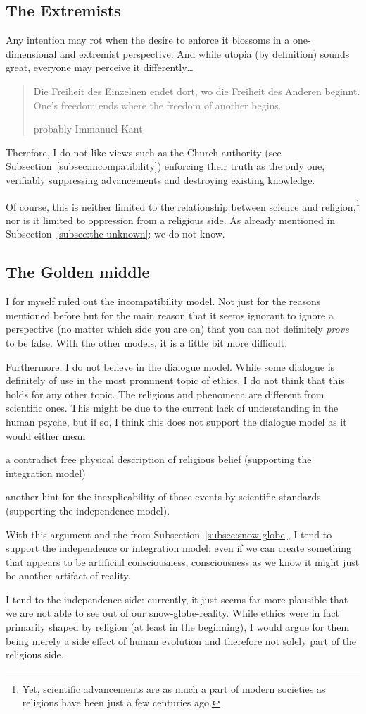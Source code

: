 \subsection{The Extremists}
Any intention may rot when the desire to enforce it blossoms in a one-dimensional and extremist perspective.
And while utopia (by definition) sounds great, everyone may perceive it differently\ldots
\blockquote[probably Immanuel Kant]{Die Freiheit des Einzelnen endet dort, wo die Freiheit des Anderen beginnt.\\\textcolor{gray}{One's freedom ends where the freedom of another begins.}}
Therefore, I do not like views such as the Church authority (see Subsection~\ref{subsec:incompatibility}) enforcing their truth as the only one, verifiably suppressing advancements and destroying existing knowledge.

Of course, this is neither limited to the relationship between science and religion,\footnote{Yet, scientific advancements are as much a part of modern societies as religions have been just a few centuries ago.} nor is it limited to oppression from a religious side. As already mentioned in Subsection~\ref{subsec:the-unknown}: we do not know.


\subsection{The Golden middle}
\label{subsec:golden-middle}
I for myself ruled out the incompatibility model. Not just for the reasons mentioned before but for the main reason that it seems ignorant to ignore a perspective (no matter which side you are on) that you can not definitely \emph{prove} to be false.
With the other models, it is a little bit more difficult.

Furthermore, I do not believe in the dialogue model. While some dialogue is definitely of use in the most prominent topic of ethics, I do not think that this holds for any other topic. The religious  and phenomena are different from scientific ones. This might be due to the current lack of understanding in the human psyche, but if so, I think this does not support the dialogue model as it would either mean \begin{orlist}
    \item a contradict free physical description of religious belief (supporting the integration model)
    \item another hint for the inexplicability of those events by scientific standards (supporting the independence model).
\end{orlist}

With this argument and the  from Subsection~\ref{subsec:snow-globe}, I tend to support the independence or integration model: even if we can create something that appears to be artificial consciousness, consciousness as we know it might just be another artifact of  reality.

I tend to the independence side: currently, it just seems far more plausible that we are not able to see out of our snow-globe-reality.
While ethics were in fact primarily shaped by religion (at least in the beginning), I would argue for them being merely a side effect of human evolution and therefore not solely part of the religious side.